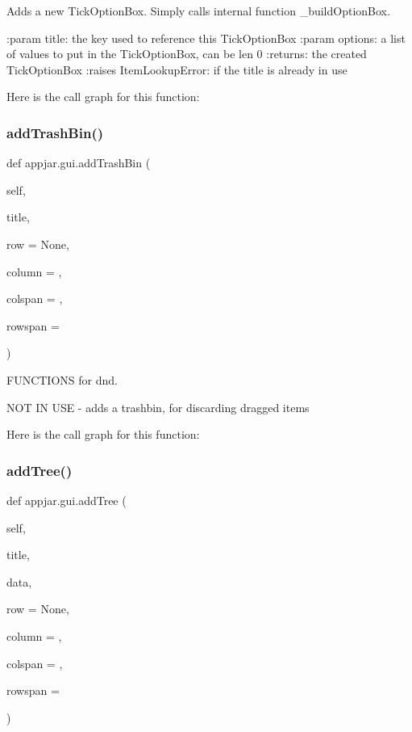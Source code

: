 \begin{DoxyVerb}Adds a new TickOptionBox.
Simply calls internal function _buildOptionBox.

:param title: the key used to reference this TickOptionBox
:param options: a list of values to put in the TickOptionBox, can be len 0
:returns: the created TickOptionBox
:raises ItemLookupError: if the title is already in use
\end{DoxyVerb}
 Here is the call graph for this function\+:
\mbox{\label{classappjar_1_1gui_ac7bb3be2f249fc846bfd207b94a55d58}} 
\subsubsection{\texorpdfstring{add\+Trash\+Bin()}{addTrashBin()}}
{\footnotesize\ttfamily def appjar.\+gui.\+add\+Trash\+Bin (\begin{DoxyParamCaption}\item[{}]{self,  }\item[{}]{title,  }\item[{}]{row = {\ttfamily None},  }\item[{}]{column = {},  }\item[{}]{colspan = {},  }\item[{}]{rowspan = {} }\end{DoxyParamCaption})}



F\+U\+N\+C\+T\+I\+O\+NS for dnd. 

\begin{DoxyVerb}NOT IN USE - adds a trashbin, for discarding dragged items \end{DoxyVerb}
 Here is the call graph for this function\+:
\mbox{\label{classappjar_1_1gui_a9bec25f1a4a98f361eeadd875055f95d}} 
\subsubsection{\texorpdfstring{add\+Tree()}{addTree()}}
{\footnotesize\ttfamily def appjar.\+gui.\+add\+Tree (\begin{DoxyParamCaption}\item[{}]{self,  }\item[{}]{title,  }\item[{}]{data,  }\item[{}]{row = {\ttfamily None},  }\item[{}]{column = {},  }\item[{}]{colspan = {},  }\item[{}]{rowspan = {} }\end{DoxyParamCaption})}

